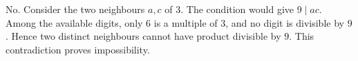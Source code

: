 No. Consider the two neighbours $a,c$ of $3$. The condition would give $9\mid ac$. Among the available digits, only $6$ is a multiple of $3$, and no digit is divisible by $9$. Hence two distinct neighbours cannot have product divisible by $9$. This contradiction proves impossibility.
